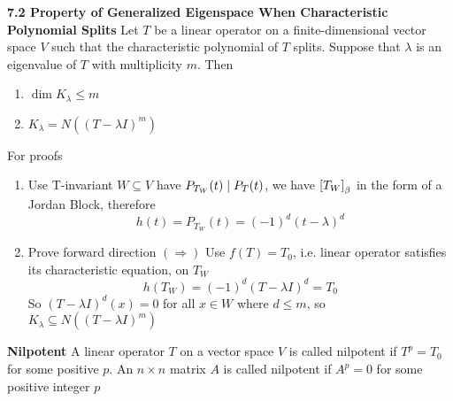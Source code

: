 \documentclass[11pt]{article}
\begin{document}
\begin{theorem*}
    \textbf{7.2 Property of Generalized Eigenspace When Characteristic Polynomial Splits} Let $T$ be a linear operator on a finite-dimensional vector space $V$ such that the characteristic polynomial of $T$ splits. Suppose that $\lambda$ is an eigenvalue of $T$ with multiplicity $m$. Then 
    \begin{enumerate}
        \item $\dim{K_{\lambda}} \leq m$ 
        \item $K_{\lambda} = N((T-\lambda I)^m)$
    \end{enumerate}
    For proofs
    \begin{enumerate}
        \item Use  T-invariant $W\subseteq V$ have $P_{T_W}(t) \mid P_T(t)$, we have $\left[ T_W \right]_{\beta}$ in the form of a Jordan Block, therefore 
        \[
            h(t) = P_{T_W}(t) = (-1)^d(t-\lambda)^d    
        \]
        \item Prove forward direction $(\Rightarrow)$ Use  $f(T) = T_0$, i.e. linear operator satisfies its characteristic equation, on $T_W$
        \[
            h(T_W) = (-1)^d (T-\lambda I)^d = T_0
        \]
        So $(T-\lambda I)^d(x) = 0$ for all $x\in W$ where $d\leq m$, so $K_{\lambda} \subseteq N((T-\lambda I)^m)$
    \end{enumerate}
\end{theorem*}


\begin{defn*}
    \textbf{Nilpotent} A linear operator $T$ on a vector space $V$ is called nilpotent if $T^p = T_0$ for some positive $p$. An $n\times n$ matrix $A$ is called nilpotent if $A^p = 0$ for some positive integer $p$
\end{defn*}
\end{document}
